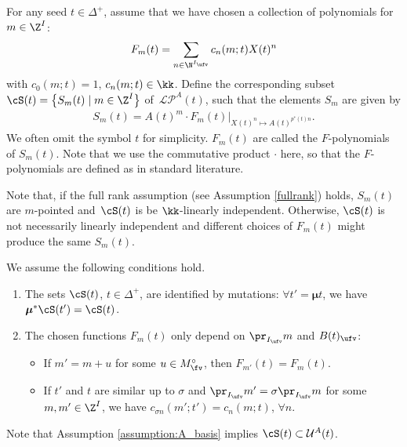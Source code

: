 \documentclass[pdftex]{sigma}
\newcommand{\Mc}{M^\circ}
\newcommand{\Iufv}{I_{\ufv}}
\newcommand{\upClAlg}{\mathcal{U}^A}
\newcommand{\LP}{{\mathcal{LP}}}
\newcommand{\seq}{\boldsymbol{\mu}}%
\numberwithin{equation}{section}
\begin{document}
For any seed $t\in \Delta^+$, assume that we have chosen a collection of polynomials for $m\in \Z^I$: \[F_{m}(t)=\sum_{n\in\N^{\Iufv}}c_{n}(m;t)X(t)^{n}\]
with $c_{0}(m;t)=1$, $c_{n}(m;t)\in\kk$. Define the corresponding subset $\cS(t)=\big\{S_{m}(t)\mid m\in\Z^I\big\}$
of~$\LP^{A}(t)$, such that the elements $S_{m}$ are given by
\begin{align*}S_{m}(t)=A(t)^{m}\cdot F_{m}(t)|_{X(t)^n\mapsto A(t)^{p^{*}(t)n}}.\end{align*}
We often omit the symbol $t$ for simplicity. $F_m(t)$ are called the $F$-polynomials of $S_m(t)$. Note that we use the commutative product $\cdot$ here, so that the $F$-polynomials are defined as in standard literature.

Note that, if the full rank assumption (see Assumption \ref{fullrank}) holds, $S_m(t)$ are $m$-pointed and~$\cS(t)$ is
be $\kk$-linearly independent. Otherwise, $\cS(t)$ is not necessarily linearly independent and different choices of $F_m(t)$ might produce the same $S_m(t)$.

\begin{Assumption}\label{assumption:A_basis}
 We assume the following conditions hold.
\begin{enumerate}\itemsep=0pt
\item[(1)] The sets $\cS(t)$, $t\in\Delta^{+}$, are identified by mutations: $\forall t'=\seq t$, we have $\seq^{*}\cS(t')=\cS(t)$.

\item[(2)] The chosen functions $F_{m}(t)$ only depend on $\pr_{\Iufv}m$ and $B(t)_{\ufv}$:
\begin{itemize}\itemsep=0pt
\item If $m'=m+u$ for some $u\in\Mc_{\fv}$, then $F_{m'}(t)=F_{m}(t)$.
\item If $t'$ and $t$ are similar up to $\sigma$ and $\pr_{\Iufv}m'=\sigma\pr_{\Iufv}m$
for some $m,m'\in\Z^{I}$, we have $c_{\sigma n}(m';t')=c_{n}(m;t)$,
$\forall n$.
\end{itemize}
\end{enumerate}
\end{Assumption}
Note that Assumption \ref{assumption:A_basis} implies $\cS(t)\subset\upClAlg(t)$.
\end{document}
